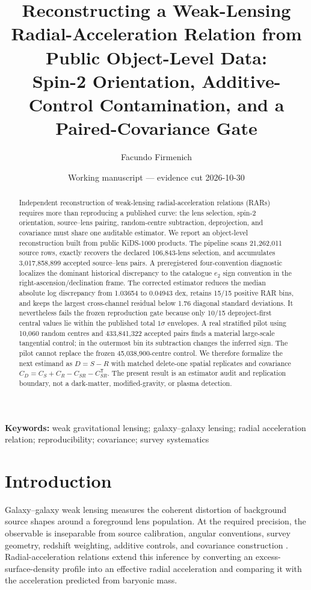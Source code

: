 \documentclass[11pt]{article}
\title{\textbf{Reconstructing a Weak-Lensing Radial-Acceleration Relation from Public Object-Level Data:}\\
Spin-2 Orientation, Additive-Control Contamination, and a Paired-Covariance Gate}
\author[1]{Facundo Firmenich}
\affil[1]{Centro de Estudios del Sur (CEDESUR), Universidad Nacional Arturo Jauretche, Buenos Aires, Argentina}
\date{Working manuscript --- evidence cut 2026-10-30}
\begin{document}
\maketitle

\begin{abstract}
Independent reconstruction of weak-lensing radial-acceleration relations (RARs)
requires more than reproducing a published curve: the lens selection, spin-2
orientation, source--lens pairing, random-centre subtraction, deprojection, and
covariance must share one auditable estimator. We report an object-level
reconstruction built from public KiDS-1000 products. The pipeline scans
21,262,011 source rows, exactly recovers the declared 106,843-lens selection,
and accumulates 3,017,858,899 accepted source--lens pairs. A preregistered
four-convention diagnostic localizes the dominant historical discrepancy to
the catalogue $e_2$ sign convention in the right-ascension/declination frame.
The corrected estimator reduces the median absolute log discrepancy from
1.03654 to 0.04943 dex, retains 15/15 positive RAR bins, and keeps the largest
cross-channel residual below 1.76 diagonal standard deviations. It nevertheless
fails the frozen reproduction gate because only 10/15 deproject-first central
values lie within the published total $1\sigma$ envelopes. A real stratified
pilot using 10,060 random centres and 433,841,322 accepted pairs finds a
material large-scale tangential control; in the outermost bin its subtraction
changes the inferred sign. The pilot cannot replace the frozen 45,038,900-centre
control. We therefore formalize the next estimand as $D=S-R$ with matched
delete-one spatial replicates and covariance
$C_D=C_S+C_R-C_{SR}-C_{SR}^{\mathsf T}$. The present result is an estimator
audit and replication boundary, not a dark-matter, modified-gravity, or plasma
detection.
\end{abstract}

\noindent\textbf{Keywords:} weak gravitational lensing; galaxy--galaxy
lensing; radial acceleration relation; reproducibility; covariance; survey
systematics

\section{Introduction}

Galaxy--galaxy weak lensing measures the coherent distortion of background
source shapes around a foreground lens population. At the required precision,
the observable is inseparable from source calibration, angular conventions,
survey geometry, redshift weighting, additive controls, and covariance
construction \citep{Mandelbaum2018,Singh2017}. Radial-acceleration relations
extend this inference by converting an excess-surface-density profile into an
effective radial acceleration and comparing it with the acceleration predicted
from baryonic mass.
\end{document}
